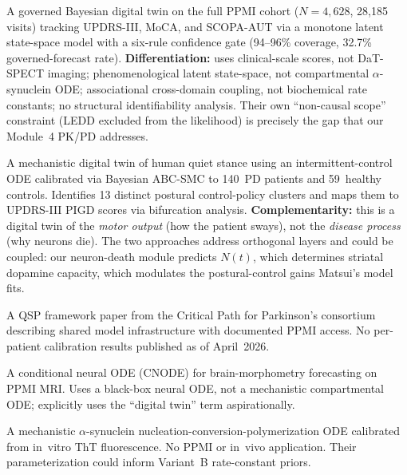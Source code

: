 \begin{description}[style=nextline]
\item[Hemedan et al.\ 2026~\cite{hemedan2026}] A governed Bayesian digital twin on the full PPMI cohort ($N=4{,}628$, 28,185 visits) tracking UPDRS-III, MoCA, and SCOPA-AUT via a monotone latent state-space model with a six-rule confidence gate (94--96\% coverage, 32.7\% governed-forecast rate). \textbf{Differentiation:} uses clinical-scale scores, not DaT-SPECT imaging; phenomenological latent state-space, not compartmental $\alpha$-synuclein ODE; associational cross-domain coupling, not biochemical rate constants; no structural identifiability analysis. Their own ``non-causal scope'' constraint (LEDD excluded from the likelihood) is precisely the gap that our Module~4 PK/PD addresses.

\item[Matsui et al.\ 2026~\cite{matsui2026stance}] A mechanistic digital twin of human quiet stance using an intermittent-control ODE calibrated via Bayesian ABC-SMC to 140~PD patients and 59~healthy controls. Identifies 13 distinct postural control-policy clusters and maps them to UPDRS-III PIGD scores via bifurcation analysis. \textbf{Complementarity:} this is a digital twin of the \emph{motor output} (how the patient sways), not the \emph{disease process} (why neurons die). The two approaches address orthogonal layers and could be coupled: our neuron-death module predicts $N(t)$, which determines striatal dopamine capacity, which modulates the postural-control gains Matsui's model fits.

\item[Denaro \& Stephenson 2024~\cite{denaro2024}] A QSP framework paper from the Critical Path for Parkinson's consortium describing shared model infrastructure with documented PPMI access. No per-patient calibration results published as of April~2026.

\item[Wang et al.\ 2025] A conditional neural ODE (CNODE) for brain-morphometry forecasting on PPMI MRI. Uses a black-box neural ODE, not a mechanistic compartmental ODE; explicitly uses the ``digital twin'' term aspirationally.

\item[Righetti et al.\ 2025~\cite{righetti2025}] A mechanistic $\alpha$-synuclein nucleation-conversion-polymerization ODE calibrated from in~vitro ThT fluorescence. No PPMI or in~vivo application. Their parameterization could inform Variant~B rate-constant priors.
\end{description}


